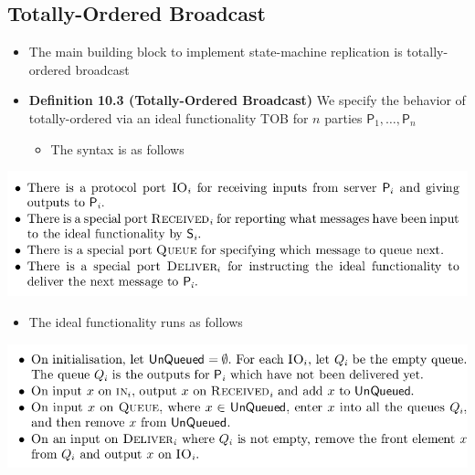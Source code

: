 \documentclass[11pt]{article}
\begin{document}
\subsection{Totally-Ordered Broadcast}
\label{sec:org5f5d320}
\begin{itemize}
\item The main building block to implement state-machine replication is totally-ordered broadcast

\item \textbf{Definition 10.3 (Totally-Ordered Broadcast)} We specify the behavior of totally-ordered via an ideal functionality TOB for \(n\) parties \(\mathsf P_1, \dots, \mathsf P_n\)
\begin{itemize}
\item The syntax is as follows
\end{itemize}
\end{itemize}
\begin{center}
\includegraphics[width=.9\linewidth]{State Machine Replication (10)/screenshot_2018-10-21_08-51-18.png}
\end{center}
\begin{itemize}
\item The ideal functionality runs as follows
\end{itemize}
\begin{center}
\includegraphics[width=.9\linewidth]{State Machine Replication (10)/screenshot_2018-10-21_08-51-36.png}
\end{center}
\end{document}

